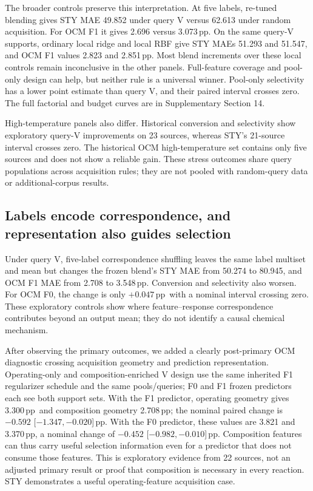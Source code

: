 \documentclass[11pt]{article}
\newcommand{\pp}{\,pp}
\begin{document}
The broader controls preserve this interpretation. At five labels, re-tuned blending gives STY MAE 49.852 under query V versus 62.613 under random acquisition. For OCM F1 it gives 2.696 versus 3.073\pp. On the same query-V supports, ordinary local ridge and local RBF give STY MAEs 51.293 and 51.547, and OCM F1 values 2.823 and 2.851\pp. Most blend increments over these local controls remain inconclusive in the other panels. Full-feature coverage and pool-only design can help, but neither rule is a universal winner. Pool-only selectivity has a lower point estimate than query V, and their paired interval crosses zero. The full factorial and budget curves are in Supplementary Section 14.

High-temperature panels also differ. Historical conversion and selectivity show exploratory query-V improvements on 23 sources, whereas STY's 21-source interval crosses zero. The historical OCM high-temperature set contains only five sources and does not show a reliable gain. These stress outcomes share query populations across acquisition rules; they are not pooled with random-query data or additional-corpus results.

\subsection{Labels encode correspondence, and representation also guides selection}
Under query V, five-label correspondence shuffling leaves the same label multiset and mean but changes the frozen blend's STY MAE from 50.274 to 80.945, and OCM F1 MAE from 2.708 to 3.548\pp. Conversion and selectivity also worsen. For OCM F0, the change is only $+0.047$\pp\ with a nominal interval crossing zero. These exploratory controls show where feature--response correspondence contributes beyond an output mean; they do not identify a causal chemical mechanism.

After observing the primary outcomes, we added a clearly post-primary OCM diagnostic crossing acquisition geometry and prediction representation. Operating-only and composition-enriched V design use the same inherited F1 regularizer schedule and the same pools/queries; F0 and F1 frozen predictors each see both support sets. With the F1 predictor, operating geometry gives 3.300\pp\ and composition geometry 2.708\pp; the nominal paired change is $-0.592$ [$-1.347,-0.020$]\pp. With the F0 predictor, these values are 3.821 and 3.370\pp, a nominal change of $-0.452$ [$-0.982,-0.010$]\pp. Composition features can thus carry useful selection information even for a predictor that does not consume those features. This is exploratory evidence from 22 sources, not an adjusted primary result or proof that composition is necessary in every reaction. STY demonstrates a useful operating-feature acquisition case.
\end{document}
